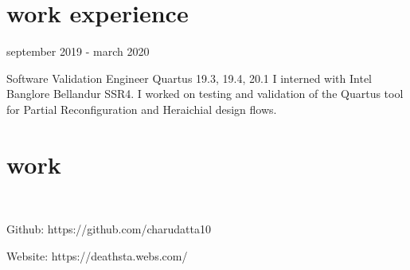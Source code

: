 \documentclass[fontsize=11pt]{tccv}
\begin{document}
\section{work experience}
\begin{fromto}
\item{september 2019 - march 2020}
\end{fromto}
\begin{project}
	\item{Software Validation Engineer}
	{Quartus 19.3, 19.4, 20.1}
	{I interned with Intel Banglore Bellandur SSR4. I worked on testing and validation of the Quartus tool for Partial Reconfiguration and Heraichial design flows.  }
\end{project}
\section{work}
\begin{skills}\\
\item {Github: https://github.com/charudatta10}
\item {Website: https://deathsta.webs.com/}\\
\end{skills}
\end{document}

